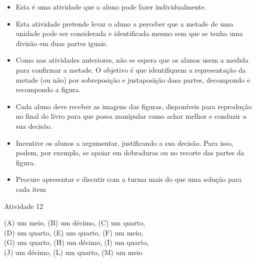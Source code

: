 \begin{multicols}{2}
 \vspace{.1cm}
 
   \vspace{.1cm}
  
\begin{itemize} %
    \item       Esta é uma atividade que o aluno pode fazer individualmente.
    \item       Esta atividade pretende levar o aluno a perceber que a metade de uma unidade pode ser considerada e identificada mesmo sem que se tenha uma divisão em duas partes iguais.
    \item       Como nas atividades anteriores, não se espera que os alunos usem a medida para confirmar a metade. O objetivo é que identifiquem a representação da metade (ou não) por sobreposição e justaposição dasa partes, decompondo e recompondo a figura.
    \item       Cada aluno deve receber as imagens das figuras, disponíveis para reprodução no final do livro para que possa manipular como achar melhor e conduzir a sua decisão.
    \item       Incentive os alunos a argumentar, justificando a sua decisão. Para isso, podem, por exemplo, se apoiar em dobraduras ou no recorte das partes da figura.
    \item       Procure apresentar e discutir com a turma mais do que uma solução para cada item
\end{itemize} %


\begin{resposta*}{Atividade 12}

\noindent
(A) um meio,  (B) um décimo, (C) um quarto,\\
(D) um quarto, (E) um quarto, (F) um meio,\\
(G) um quarto, (H) um décimo, (I) um quarto,\\
(J) um décimo, (L) um quarto, (M) um meio
\end{resposta*}

\Bg

\end{multicols}
